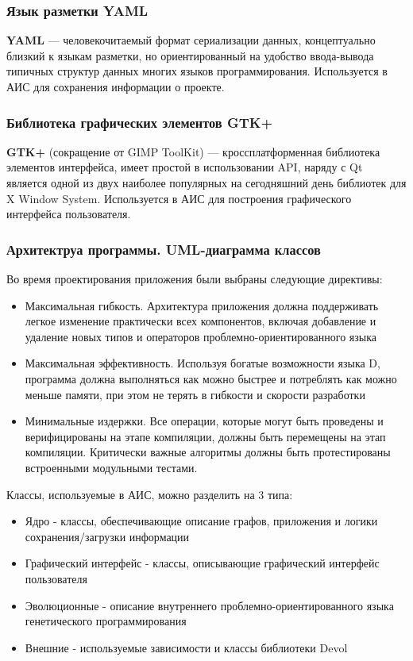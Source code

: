\documentclass[russian,utf8,emptystyle]{eskdtext}
\begin{document}
\begin{spacing}{1.5}
\subsubsection{Язык разметки YAML}
\textbf{YAML} — человекочитаемый формат сериализации данных, концептуально близкий к языкам разметки, но ориентированный на удобство ввода-вывода типичных структур данных многих языков программирования. Используется в АИС для сохранения информации о проекте.

\subsubsection{Библиотека графических элементов GTK+}
\textbf{GTK+} (сокращение от GIMP ToolKit) — кроссплатформенная библиотека элементов интерфейса, имеет простой в использовании API, наряду с Qt является одной из двух наиболее популярных на сегодняшний день библиотек для X Window System. Используется в АИС для построения графического интерфейса пользователя.

\subsubsection{Архитектруа программы. UML-диаграмма классов}
Во время проектирования приложения были выбраны следующие директивы:
\begin{itemize}
\item Максимальная гибкость. Архитектура приложения должна поддерживать легкое изменение практически всех компонентов, включая добавление и удаление новых типов и операторов проблемно-ориентированного языка
\item Максимальная эффективность. Используя богатые возможности языка D, программа должна выполняться как можно быстрее и потреблять как можно меньше памяти, при этом не терять в гибкости и скорости разработки
\item Минимальные издержки. Все операции, которые могут быть проведены и верифицированы на этапе компиляции, должны быть перемещены на этап компиляции. Критически важные алгоритмы должны быть протестированы встроенными модульными тестами.
\end{itemize}

Классы, используемые в АИС, можно разделить на 3 типа:
\begin{itemize}
\item Ядро - классы, обеспечивающие описание графов, приложения и логики сохранения/загрузки информации
\item Графический интерфейс - классы, описывающие графический интерфейс пользователя
\item Эволюционные - описание внутреннего проблемно-ориентированного языка генетического программирования
\item Внешние - используемые зависимости и классы библиотеки Devol
\end{itemize}


\end{spacing}
\end{document}
